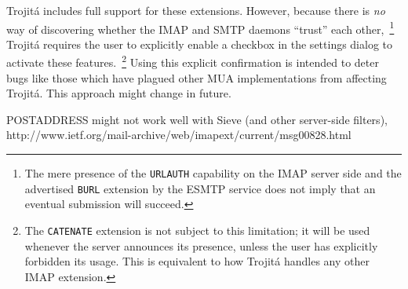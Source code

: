 \documentclass[trojita]{subfiles}
\begin{document}
Trojitá includes full support for these extensions.  However, because there is {\em no} way of discovering whether the
IMAP and SMTP daemons ``trust'' each other,~\footnote{The mere presence of the {\tt URLAUTH} capability on the IMAP
server side and the advertised {\tt BURL} extension by the ESMTP service does not imply that an eventual submission will
succeed.} Trojitá requires the user to explicitly enable a checkbox in the settings dialog to activate these
features.~\footnote{The {\tt CATENATE} extension is not subject to this limitation; it will be used whenever the server
announces its presence, unless the user has explicitly forbidden its usage.  This is equivalent to how Trojitá handles
any other IMAP extension.}  Using this explicit confirmation is intended to deter bugs like those which have plagued
other MUA implementations \cite{qmf-fastmail-burl-bug} from affecting Trojitá.  This approach might change in future.



POSTADDRESS might not work well with Sieve (and other server-side filters),
http://www.ietf.org/mail-archive/web/imapext/current/msg00828.html

\end{document}
